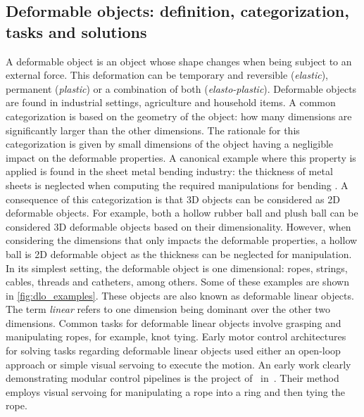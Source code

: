 \subsection{Deformable objects: definition, categorization, tasks and solutions}
A deformable object is an object whose shape changes when being subject to an external force. This deformation can be temporary and reversible (\textit{elastic}), permanent (\textit{plastic}) or a combination of both (\textit{elasto-plastic}). Deformable objects are found in industrial settings, agriculture and household items. A common categorization \autocite{Saadat2002,Jimenez2012} is based on the geometry of the object: how many dimensions are significantly larger than the other dimensions. The rationale for this categorization is given by small dimensions of the object having a negligible impact on the deformable properties. A canonical example where this property is applied is found in the sheet metal bending industry: the thickness of metal sheets is neglected when computing the required manipulations for bending \autocite{Duflou2005}. A consequence of this categorization is that 3D objects can be considered as 2D deformable objects. For example, both a hollow rubber ball and plush ball can be considered 3D deformable objects based on their dimensionality. However, when considering the dimensions that only impacts the deformable properties, a hollow ball is 2D deformable object as the thickness can be neglected for manipulation. 
In its simplest setting, the deformable object is one dimensional: ropes, strings, cables, threads and catheters, among others. Some of these examples are shown in \cref{fig:dlo_examples}. These objects are also known as deformable linear objects. The term \textit{linear} refers to one dimension being dominant over the other two dimensions. Common tasks for deformable linear objects involve grasping and manipulating ropes, for example, knot tying. Early motor control architectures for solving tasks regarding deformable linear objects used either an open-loop approach or simple visual servoing to execute the motion. An early work clearly demonstrating modular control pipelines is the project of~\citeauthor{Inaba1987} in~\citeyear{Inaba1987}. Their method employs visual servoing for manipulating a rope into a ring and then tying the rope. 
